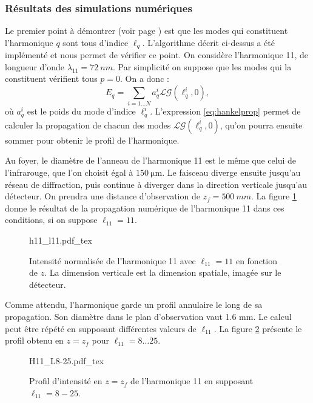 \subsubsection{Résultats des simulations numériques}
Le premier point à démontrer (voir page \pageref{enum:properties}) est que les modes qui constituent l'harmonique $q$ sont tous d'indice $\ell_q$. L'algorithme décrit ci-dessus a été implémenté et nous permet de vérifier ce point. On considère l'harmonique 11, de longueur d'onde $\lambda_{11}=\SI{72}{nm}$. Par simplicité on suppose que les modes qui la constituent vérifient tous $p=0$. On a donc :
\begin{equation}
E_{q} = \sum_{i=1\ldots N} a_q^i \mathcal{LG}(\ell_q^i,0),
\end{equation}
où $a_q^i$ est le poids du mode d'indice $\ell_q^i$. L'expression \ref{eq:hankelprop} permet de calculer la propagation de chacun des modes $\mathcal{LG}(\ell_q^i,0)$, qu'on pourra ensuite sommer pour obtenir le profil de l'harmonique. \par
Au foyer, le diamètre de l'anneau de l'harmonique 11 est le même que celui de l'infrarouge, que l'on choisit égal à $\SI{150}{\micro\m}$. Le faisceau diverge ensuite jusqu'au réseau de diffraction, puis continue à diverger dans la direction verticale jusqu'au détecteur. On prendra une distance d'observation de $z_f=\SI{500}{mm}$. La figure \ref{fig:H11_L11} donne le résultat de la propagation numérique de l'harmonique 11 dans ces conditions, si on suppose $\ell_{11}=11$.
\begin{figure}[!ht]
\centering
\def\svgwidth{.5\columnwidth}
{h11_l11.pdf_tex}
\caption{Intensité normalisée de l'harmonique 11 avec $\ell_{11} = 11$ en fonction de $z$. La dimension verticale est la dimension spatiale, imagée sur le détecteur.}
\label{fig:H11_L11}
\end{figure}
Comme attendu, l'harmonique garde un profil annulaire le long de sa propagation. Son diamètre dans le plan d'observation vaut 1.6 mm. Le calcul peut être répété en supposant différentes valeurs de $\ell_{11}$. La figure \ref{Fig:H11_L8-25} présente le profil obtenu en $z=z_f$ pour $\ell_{11}=8\ldots 25$.

\begin{figure}[!ht]
\centering
\def\svgwidth{.7\columnwidth}
{H11_L8-25.pdf_tex}
\caption{Profil d'intensité en $z=z_f$ de l'harmonique 11 en supposant $\ell_{11} = 8-25$.}
\label{Fig:H11_L8-25}
\end{figure}


